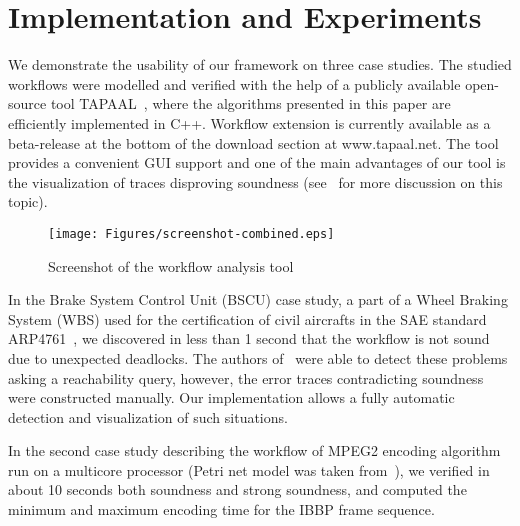 






\section{Implementation and Experiments}


We demonstrate the usability of our framework on three case studies.
The studied workflows were modelled and verified with the help of 
a publicly available open-source tool TAPAAL~\cite{DJJJMS:TACAS:12}, where
the algorithms presented in this paper are efficiently implemented
in C++. Workflow extension is currently available 
as a beta-release at the bottom of the download section at www.tapaal.net. 
The tool provides a convenient GUI support and
one of the main advantages of our tool is the visualization of traces
disproving soundness (see~\cite{FF:AWPN:06} for more discussion on 
this topic).

\begin{figure}[h]
\begin{center}
\texttt{[image: Figures/screenshot-combined.eps]}
\end{center}
\caption{Screenshot of the workflow analysis tool}
\label{fig:screenshot}
\end{figure}

In the Brake System Control Unit (BSCU) case study, a part of a 
Wheel Braking System (WBS) used for the certification of civil aircrafts 
in the SAE standard ARP4761~\cite{SEB:FESCA:13}, we discovered  
in less than 1 second that the workflow is not sound due to 
unexpected deadlocks. The authors of~\cite{SEB:FESCA:13} 
were able to detect these problems asking a reachability query,
however, the error traces contradicting soundness were constructed
manually. Our implementation allows a fully automatic detection and
visualization of such situations.

In the second case study describing the workflow of MPEG2 encoding algorithm
run on a multicore processor (Petri net model was taken 
from~\cite{PCVMP:MMM:04}), we verified in about 10 seconds 
both soundness and strong soundness, and computed 
the minimum and maximum encoding time for the IBBP frame sequence.

